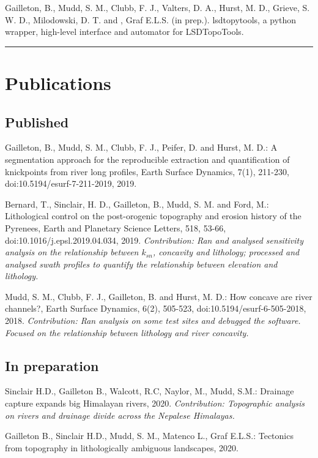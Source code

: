 \documentclass[10pt, a4paper]{article}
\newcommand{\years}[1]{\marginnote{\scriptsize #1}}
\begin{document}
Gailleton, B., Mudd, S. M., Clubb, F. J., Valters, D. A., Hurst, M. D., Grieve, S. W. D., Milodowski, D. T. and , Graf E.L.S. (in prep.). lsdtopytools, a python wrapper, high-level interface and automator for LSDTopoTools.\par


\hrule
\section*{Publications}

\subsection*{Published}

\years{2019}\hangindent=0.7cm Gailleton, B., Mudd, S. M., Clubb, F. J., Peifer, D. and Hurst, M. D.: A segmentation approach for the reproducible extraction and quantification of knickpoints from river long profiles, Earth Surface Dynamics, 7(1), 211-230, doi:10.5194/esurf-7-211-2019, 2019.\par
\years{2019}\hangindent=0.7cm Bernard, T., Sinclair, H. D., Gailleton, B., Mudd, S. M. and Ford, M.: Lithological control on the post-orogenic topography and erosion history of the Pyrenees, Earth and Planetary Science Letters, 518, 53-66, doi:10.1016/j.epsl.2019.04.034, 2019. \textit{Contribution: Ran and analysed sensitivity analysis on the relationship between $k_{sn}$, concavity and lithology; processed and analysed swath profiles to quantify the relationship between elevation and lithology.}\par
\years{2018}\hangindent=0.7cm Mudd, S. M., Clubb, F. J., Gailleton, B. and Hurst, M. D.: How concave are river channels?, Earth Surface Dynamics, 6(2), 505-523, doi:10.5194/esurf-6-505-2018, 2018. \textit{Contribution: Ran analysis on some test sites and debugged the software. Focused on the relationship between lithology and river concavity.}\par


\subsection*{In preparation}
\years{2020?}\hangindent=0.7cm Sinclair H.D., Gailleton B., Walcott, R.C, Naylor, M., Mudd, S.M.: Drainage capture expands big Himalayan rivers, 2020. \textit{Contribution: Topographic analysis on rivers and drainage divide across the Nepalese Himalayas.}\par
\years{2020?}\hangindent=0.7cm Gailleton B., Sinclair H.D., Mudd, S. M., Matenco L., Graf E.L.S.: Tectonics from topography in lithologically ambiguous landscapes, 2020.\par
\end{document}
